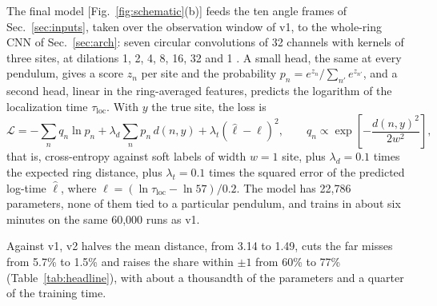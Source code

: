 \documentclass[11pt]{article}
\begin{document}
The final model [Fig.~\ref{fig:schematic}(b)] feeds the ten angle frames of Sec.~\ref{sec:inputs}, taken over the observation window of v1, to the whole-ring CNN of Sec.~\ref{sec:arch}: seven circular convolutions of 32 channels with kernels of three sites, at dilations 1, 2, 4, 8, 16, 32 and 1 \cite{yu2016multiscale,oord2016wavenet}. A small head, the same at every pendulum, gives a score $z_n$ per site and the probability $p_n=e^{z_n}/\sum_{n'}e^{z_{n'}}$, and a second head, linear in the ring-averaged features, predicts the logarithm of the localization time $\tau_{\mathrm{loc}}$. With $y$ the true site, the loss is
\begin{equation}
\label{eq:loss}
\mathcal{L} = -\sum_n q_n\ln p_n + \lambda_d\sum_n p_n\, d(n,y) + \lambda_t\left(\hat\ell-\ell\right)^2,
\qquad q_n\propto\exp\!\left[-\frac{d(n,y)^2}{2w^2}\right],
\end{equation}
that is, cross-entropy against soft labels of width $w=1$ site, plus $\lambda_d=0.1$ times the expected ring distance, plus $\lambda_t=0.1$ times the squared error of the predicted log-time $\hat\ell$, where $\ell=(\ln\tau_{\mathrm{loc}}-\ln57)/0.2$. The model has 22,786 parameters, none of them tied to a particular pendulum, and trains in about six minutes on the same 60,000 runs as v1.

Against v1, v2 halves the mean distance, from 3.14 to 1.49, cuts the far misses from 5.7\% to 1.5\% and raises the share within $\pm1$ from 60\% to 77\% (Table~\ref{tab:headline}), with about a thousandth of the parameters and a quarter of the training time.
\end{document}
